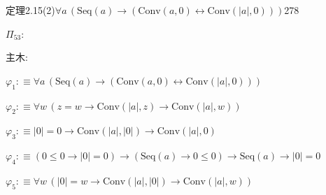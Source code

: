 \begin{fullproof}{定理2.15(2)}{$\forall a\,(\mathrm{Seq}(a) \to (\mathrm{Conv}(a,0) \leftrightarrow \mathrm{Conv}(\lvert a \rvert,0)))$}{278}
\begin{ptree}
\noLine
{}
\end{ptree}
\noindent$\Pi_{53}$:
\begin{ptree}
\noLine
{}
\noLine
{}
\noLine
{}
\end{ptree}
\noindent 主木:
\begin{ptree}
\noLine
{}
\noLine
{}
\noLine
{}
\end{ptree}
\begin{abbrevlist}
\item $\varphi_{1} :\equiv \forall a\,(\mathrm{Seq}(a) \to (\mathrm{Conv}(a,0) \leftrightarrow \mathrm{Conv}(\lvert a \rvert,0)))$
\item $\varphi_{2} :\equiv \forall w\,(z = w \to \mathrm{Conv}(\lvert a \rvert,z) \to \mathrm{Conv}(\lvert a \rvert,w))$
\item $\varphi_{3} :\equiv \lvert 0 \rvert = 0 \to \mathrm{Conv}(\lvert a \rvert,\lvert 0 \rvert) \to \mathrm{Conv}(\lvert a \rvert,0)$
\item $\varphi_{4} :\equiv (0 \leq 0 \to \lvert 0 \rvert = 0) \to (\mathrm{Seq}(a) \to 0 \leq 0) \to \mathrm{Seq}(a) \to \lvert 0 \rvert = 0$
\item $\varphi_{5} :\equiv \forall w\,(\lvert 0 \rvert = w \to \mathrm{Conv}(\lvert a \rvert,\lvert 0 \rvert) \to \mathrm{Conv}(\lvert a \rvert,w))$

\end{abbrevlist}
\end{fullproof}
